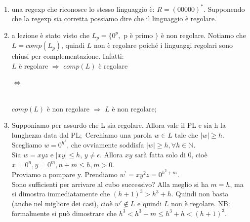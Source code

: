 \documentclass[a4paper,11pt]{article}
\begin{document}
    \begin{enumerate}
        \item una regexp che riconosce lo stesso linguaggio è: $R=(00000)^*$. Supponendo che la regexp sia corretta possiamo dire che il linguaggio è regolare.
        \item a lezione è stato visto che $L_p=\{0^p,$ p è primo $\}$ è non regolare. Notiamo che $L=comp(L_p)$, quindi $L$ non è regolare poiché i linguaggi regolari sono chiusi per complementazione. Infatti:\\$L$ è regolare $\Rightarrow$ $comp(L)$ è regolare\\
        \begin{minipage}{\linewidth}
        \centering $\Leftrightarrow$ 
        \end{minipage}
        \\$comp(L)$ è non regolare $\Rightarrow$ $L$ è non regolare;
        \item Supponiamo per assurdo che L sia regolare. Allora vale il PL e sia h la lunghezza data dal PL;\
        Cerchiamo una parola $w\in L$ tale che $|w|\geq h$.\\
        Scegliamo $w=0^{h^3}$, che ovviamente soddisfa $|w|\geq h, \forall h \in \mathbb{N}$.\\
        Sia $w=xyz$ e $|xy|\leq h$, $y\neq\epsilon$. Allora $xy$ sarà fatta solo di $0$, cioè $x=0^n, y=0^m, n+m\leq h, m>0$.\\
        Proviamo a pompare y. Prendiamo $w^{'}=xy^2z=0^{h^3+m}$.\\Sono sufficienti per arrivare al cubo successivo? Alla meglio si ha $m=h$, ma si dimostra immediatamente che $(h+1)^3>h^3+h$. Quindi non basta (anche nel migliore dei casi), cioè $w'\notin L$ e quindi $L$ non è regolare.
        NB: formalmente si può dimostrare che $h^3<h^3+m\leq h^3+h<(h+1)^3$.
    \end{enumerate}
    
\end{document}
